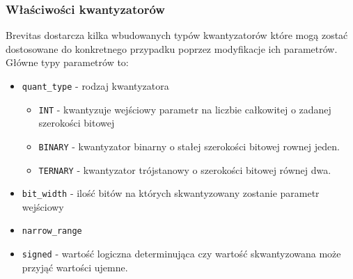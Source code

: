 \documentclass[../main.tex]{subfiles}
\begin{document}
\subsubsection{Właściwości kwantyzatorów}

Brevitas dostarcza kilka wbudowanych typów kwantyzatorów które mogą zostać dostosowane do konkretnego przypadku poprzez modyfikacje ich parametrów. Główne typy parametrów to:

\begin{itemize}
    \item \texttt{quant\_type} - rodzaj kwantyzatora 
    \begin{itemize}
        \item \texttt{INT} - kwantyzuje wejściowy parametr na liczbie całkowitej o zadanej szerokości bitowej
        \item \texttt{BINARY} - kwantyzator binarny o stałej szerokości bitowej rownej jeden.
        \item \texttt{TERNARY} - kwantyzator trójstanowy o szerokości bitowej równej dwa.
    \end{itemize}
    \item \texttt{bit\_width} - ilość bitów na których skwantyzowany zostanie parametr wejściowy
    \item \texttt{narrow\_range}
    \item \texttt{signed} - wartość logiczna determinująca czy wartość skwantyzowana może przyjąć wartości ujemne.

\end{itemize}
\end{document}
